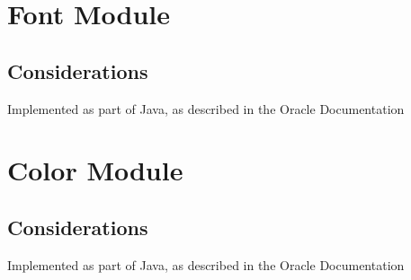 \documentclass{article}
\begin{document}
\section*{Font Module}
	\subsection*{Considerations}
		Implemented as part of Java, as described in the Oracle Documentation

\section*{Color Module}
	\subsection*{Considerations}
		Implemented as part of Java, as described in the Oracle Documentation
\end{document}
